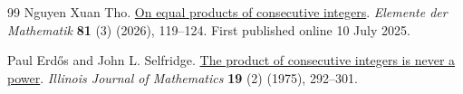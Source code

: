 \begin{thebibliography}{99}
{Nguyen Xuan Tho}. \href{https://doi.org/10.4171/EM/556}{On equal products of consecutive integers}.
\emph{Elemente der Mathematik} \textbf{81} (3) (2026), 119--124. First published online 10 July 2025.

Paul Erd{\H o}s and John L. Selfridge. \href{https://doi.org/10.1215/ijm/1256050816}{The product of consecutive integers is never a power}.
\emph{Illinois Journal of Mathematics} \textbf{19} (2) (1975), 292--301.

\end{thebibliography}


